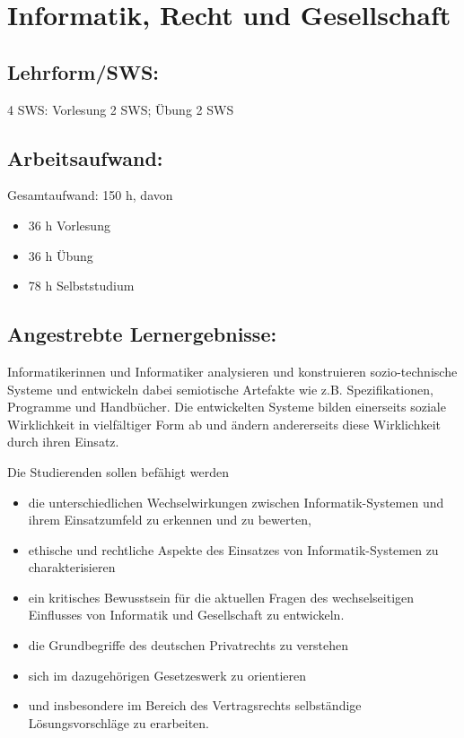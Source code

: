 \chapter{Informatik, Recht und
Gesellschaft}\label{informatik-recht-und-gesellschaft}

\section*{Lehrform/SWS:}\label{lehrformsws-12}

4 SWS: Vorlesung 2 SWS; Übung 2 SWS

\section*{Arbeitsaufwand:}\label{arbeitsaufwand-9}

Gesamtaufwand: 150 h, davon

\begin{itemize}
\item
  36 h Vorlesung
\item
  36 h Übung
\item
  78 h Selbststudium
\end{itemize}

\section*{Angestrebte
Lernergebnisse:}\label{angestrebte-lernergebnisse-16}

Informatikerinnen und Informatiker analysieren und konstruieren
sozio-technische Systeme und entwickeln dabei semiotische Artefakte wie
z.B. Spezifikationen, Programme und Handbücher. Die entwickelten Systeme
bilden einerseits soziale Wirklichkeit in vielfältiger Form ab und
ändern andererseits diese Wirklichkeit durch ihren Einsatz.

Die Studierenden sollen befähigt werden

\begin{itemize}
\item
  die unterschiedlichen Wechselwirkungen zwischen Informatik-Systemen
  und ihrem Einsatzumfeld zu erkennen und zu bewerten,
\item
  ethische und rechtliche Aspekte des Einsatzes von Informatik-Systemen
  zu charakterisieren
\item
  ein kritisches Bewusstsein für die aktuellen Fragen des
  wechselseitigen Einflusses von Informatik und Gesellschaft zu
  entwickeln.
\item
  die Grundbegriffe des deutschen Privatrechts zu verstehen
\item
  sich im dazugehörigen Gesetzeswerk zu orientieren
\item
  und insbesondere im Bereich des Vertragsrechts selbständige
  Lösungsvorschläge zu erarbeiten.
\end{itemize}

